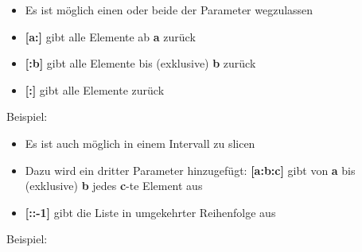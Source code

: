 \begin{frame}
    \slidehead
    \begin{itemize}
        \item Es ist möglich einen oder beide der Parameter wegzulassen
            \pause
        \item \textbf{[a:]} gibt alle Elemente ab \textbf{a} zurück
            \pause
        \item \textbf{[:b]} gibt alle Elemente bis (exklusive) \textbf{b} zurück
            \pause
        \item \textbf{[:]} gibt alle Elemente zurück
    \end{itemize}
    \pause
    \vspace{-0.1cm}
    \begin{block}{Beispiel:}
    \end{block}
\end{frame}

\begin{frame}
    \slidehead
    \begin{itemize}
        \item Es ist auch möglich in einem Intervall zu slicen
            \pause
        \item Dazu wird ein dritter Parameter hinzugefügt: \textbf{[a:b:c]} gibt von \textbf{a} bis (exklusive) \textbf{b} jedes \textbf{c}-te Element aus
            \pause
        \item \textbf{[::-1]} gibt die Liste in umgekehrter Reihenfolge aus
    \end{itemize}
    \pause
    \vspace{-0.1cm}
    \begin{block}{Beispiel:}
    \end{block}
\end{frame}

\livecoding


\subtitle{Kapitel 5: ganz viele Variablen in einer}


